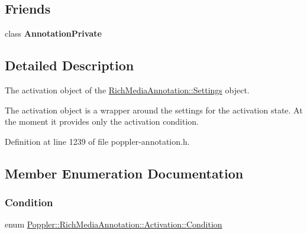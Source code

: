 \subsection*{Friends}
\begin{DoxyCompactItemize}
\item 
\mbox{\label{class_poppler_1_1_rich_media_annotation_1_1_activation_add0bc3e32e560f9e9eb3025587c1ad54}} 
class {\bfseries Annotation\+Private}
\end{DoxyCompactItemize}


\subsection{Detailed Description}
The activation object of the \hyperlink{class_poppler_1_1_rich_media_annotation_1_1_settings}{Rich\+Media\+Annotation\+::\+Settings} object.

The activation object is a wrapper around the settings for the activation state. At the moment it provides only the activation condition. 

Definition at line 1239 of file poppler-\/annotation.\+h.



\subsection{Member Enumeration Documentation}
\mbox{\label{class_poppler_1_1_rich_media_annotation_1_1_activation_a6bd1a04f2b4b84df639ba04ea08b5f85}} 
\subsubsection{\texorpdfstring{Condition}{Condition}}
{\footnotesize\ttfamily enum \hyperlink{class_poppler_1_1_rich_media_annotation_1_1_activation_a6bd1a04f2b4b84df639ba04ea08b5f85}{Poppler\+::\+Rich\+Media\+Annotation\+::\+Activation\+::\+Condition}}

